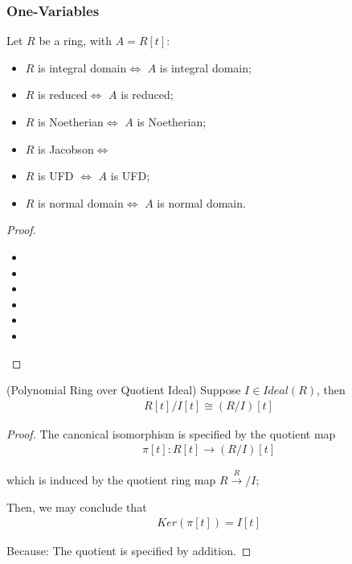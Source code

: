 \documentclass[Total.tex]{subfiles}
\begin{document}
			\subsubsection{One-Variables}
			
			\begin{proposition}
				Let $R$ be a ring, with $A=R[t]$:
				\begin{itemize}
					\item $R$ is integral domain$\Leftrightarrow$ $A$ is integral domain;
					\item $R$ is reduced$\Leftrightarrow$ $A$ is reduced;
					\item $R$ is Noetherian$\Leftrightarrow$ $A$ is Noetherian;
					\item $R$ is Jacobson$\Leftrightarrow$ 
					\item $R$ is UFD $\Leftrightarrow$ $A$ is UFD;
					\item $R$ is normal domain$\Leftrightarrow$ $A$ is normal domain. 
				\end{itemize}
			\end{proposition}
			\begin{proof}
				\begin{itemize}
					\item 
					\item 
					\item 
					\item 
					\item 
					\item 
				\end{itemize}
			\end{proof}
			
			
			\begin{lemma}
				(Polynomial Ring over Quotient Ideal) Suppose $I\in Ideal(R)$, then
				\begin{gather*}
					R[t]/I[t]\cong (R/I)[t]
				\end{gather*}
			\end{lemma}
			\begin{proof}
				The canonical isomorphism is specified by the quotient map
				\begin{gather*}
					\pi[t]:R[t]\rightarrow (R/I)[t]
				\end{gather*}
				
				which is induced by the quotient ring map $R\xrightarrow R/I$;
				
				Then, we may conclude that
				\begin{gather*}
					Ker(\pi[t])=I[t]
				\end{gather*}
				
				Because: The quotient is specified by addition. 
			\end{proof}
			
\end{document}
